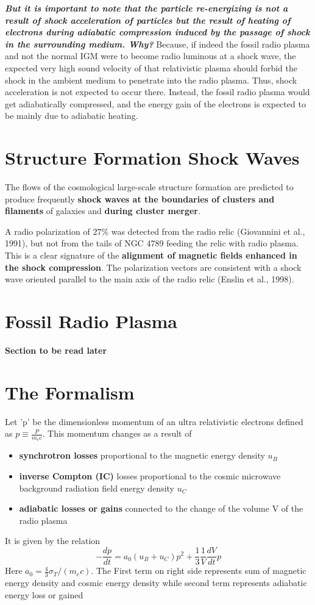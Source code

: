 \documentclass[12pt]{report}
\newcommand{\tbf}[1]{\textbf{#1}}
\newcommand{\tit}[1]{\textit{#1}}
\newcommand{\de}[2]{\frac{d{#1}}{d{#2}}}
\newcommand{\cbox}{tcolorbox}
\begin{document}
\textbf{\tit{But it is important to note that the particle re-energizing is not a result of shock acceleration of particles but the result of heating of electrons during adiabatic compression induced by the passage of shock in the surrounding medium. Why?}}
Because, if indeed the fossil radio plasma and not the normal IGM were to become radio luminous at a shock wave, the expected very high sound velocity of that relativistic plasma should forbid the shock in the ambient medium to penetrate into the radio plasma. Thus, shock acceleration is not expected to occur there. Instead, the fossil radio plasma would get adiabatically compressed, and the energy gain of the electrons is expected to be mainly due to adiabatic heating.
\section{Structure Formation Shock Waves}
The flows of the cosmological large-scale structure formation are predicted to produce frequently \tbf{shock waves at the boundaries of clusters and filaments} of galaxies and \tbf{during cluster merger}. 
\begin{\cbox}
 A radio polarization of $27\%$ was detected from the radio relic (Giovannini et al., 1991), but not from the tails of NGC 4789 feeding the relic with radio plasma. This is a clear signature of the \textbf{alignment of magnetic fields enhanced in the shock compression}. The polarization vectors are consistent with a shock wave oriented parallel to the main axis of the radio relic (Enslin et al., 1998).
\end{\cbox}
\section{Fossil Radio Plasma}
\textbf{Section to be read later}
\section{The Formalism}
Let 'p' be the dimensionless momentum of an ultra relativistic electrons defined as $p\equiv \frac{P}{m_e c}$. This momentum changes as a result of 
\begin{itemize}
\item \tbf{synchrotron losses} proportional to the magnetic energy density $u_B$
\item \tbf{inverse Compton (IC)} losses proportional to the cosmic microwave background radiation field energy density $u_C$
\item \tbf{adiabatic losses or gains} connected to the change of the volume V of the radio plasma
\end{itemize}
It is given by the relation
\begin{equation}\label{eqp}
-\de{p}{t}=a_0(u_B+u_C)p^2 +\frac{1}{3}\frac{1}{V}\de{V}{t}p
\end{equation}
Here $a_0=\frac{4}{3}\sigma_T/(m_ec)$. The First term on right side represents sum of magnetic energy density and cosmic energy density while second term represents adiabatic energy loss or gained\\
\end{document}
